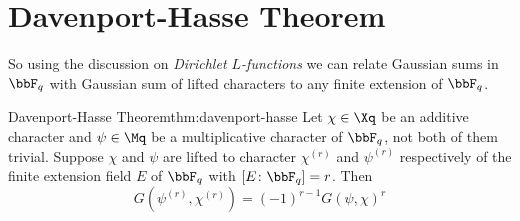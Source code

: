 \section{Davenport-Hasse Theorem}
So using the discussion on \emph{Dirichlet $L$-functions} we can relate Gaussian sums in $\bbF_q$ with Gaussian sum of lifted characters to any finite extension of $\bbF_q$. 
\begin{Theorem}{Davenport-Hasse Theorem}{thm:davenport-hasse}
  Let $\chi\in\Xq$ be an additive character and $\psi\in\Mq$ be a multiplicative character of $\bbF_q$, not both of them trivial. Suppose $\chi$ and $\psi$ are lifted to character $\chi^{(r)}$ and $\psi^{(r)}$ respectively of the finite extension field $E$ of $\bbF_q$ with $[E\colon \bbF_q]=r$. Then $$G(\psi^{(r)},\chi^{(r)})=(-1)^{r-1}G(\psi,\chi)^r$$
\end{Theorem}

